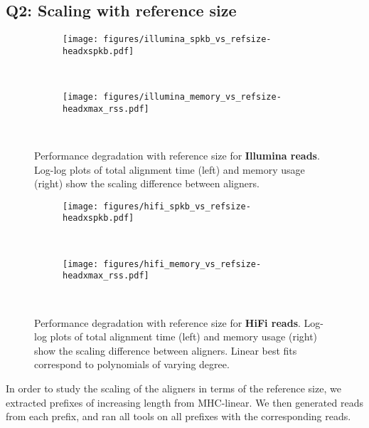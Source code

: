 \subsection{Q2: Scaling with reference size} \label{SEEDsec:eval-refsize}

\begin{figure}[t]
  \begin{subfigure}{.5\textwidth}
    \centering
    \texttt{[image: figures/illumina\_spkb\_vs\_refsize-headxspkb.pdf]}
  \end{subfigure}~\hspace{1em}
  \begin{subfigure}{.5\textwidth}
    \centering
    \texttt{[image: figures/illumina\_memory\_vs\_refsize-headxmax\_rss.pdf]}
  \end{subfigure}~\hspace{1em} \caption[Performance scaling with reference size
  (short reads)]{Performance degradation with reference size for
  \textbf{Illumina reads}. Log-log plots of total alignment time (left) and
  memory usage (right) show the scaling difference between aligners.}
  \label{SEEDfig:illumina_scaling_with_genomesize}
\end{figure}

\begin{figure}[t]
  \begin{subfigure}{.5\textwidth}
    \centering
    \texttt{[image: figures/hifi\_spkb\_vs\_refsize-headxspkb.pdf]}
  \end{subfigure}~\hspace{1em}
  \begin{subfigure}{.5\textwidth}
    \centering
    \texttt{[image: figures/hifi\_memory\_vs\_refsize-headxmax\_rss.pdf]}
  \end{subfigure}~\hspace{1em} \caption[Performance scaling with reference size
  (long reads)]{Performance degradation with reference size for \textbf{HiFi
  reads}. Log-log plots of total alignment time (left) and memory usage (right)
  show the scaling difference between aligners. Linear best fits correspond to
  polynomials of varying degree.}
  \label{SEEDfig:hifi_scaling_with_genomesize}
\end{figure}

In order to study the scaling of the aligners in terms of the reference size, we
extracted prefixes of increasing length from MHC-linear. We then generated reads
from each prefix, and ran all tools on all prefixes with the corresponding
reads.

